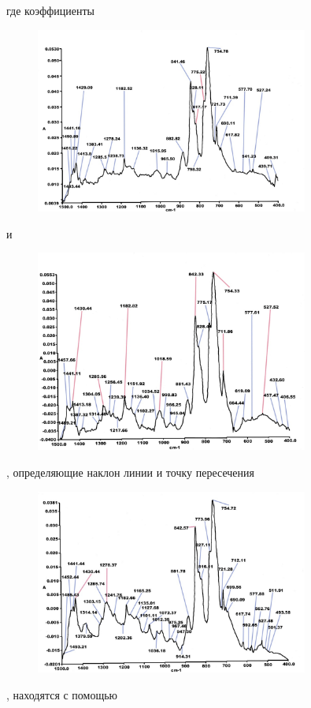 где коэффициенты \begin{figure}[H]
	\centering
	\includegraphics[width=0.8\textwidth]{assets/24}
	\caption*{}
\end{figure} и
\begin{figure}[H]
	\centering
	\includegraphics[width=0.8\textwidth]{assets/25}
	\caption*{}
\end{figure}, определяющие наклон линии и точку
пересечения \begin{figure}[H]
	\centering
	\includegraphics[width=0.8\textwidth]{assets/26}
	\caption*{}
\end{figure}, находятся с помощью
